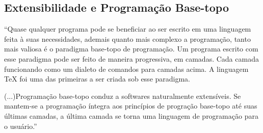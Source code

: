 \documentclass[12pt, brazilian, a5paper]{abntex2} %
\begin{document}
\subsection{Extensibilidade e Programação Base-topo} 

``Quase qualquer programa pode se beneficiar ao ser escrito em uma linguagem feita à suas necessidades, ademais quanto mais complexo a programação, tanto mais valiosa é o paradigma base-topo de programação. Um programa escrito com esse paradigma pode ser feito de maneira progressiva, em camadas. Cada camada funcionando como um dialeto de comandos para camadas acima. A linguagem \TeX{} foi uma das primeiras a ser criada sob esse paradigma.

(...)Programação base-topo conduz a softwares naturalmente extensíveis. Se mantem-se a programação íntegra aos princípios de progração base-topo até suas últimas camadas, a última camada se torna uma linguagem de programação para o usuário.'' \cite{graham1995}






\end{document}
